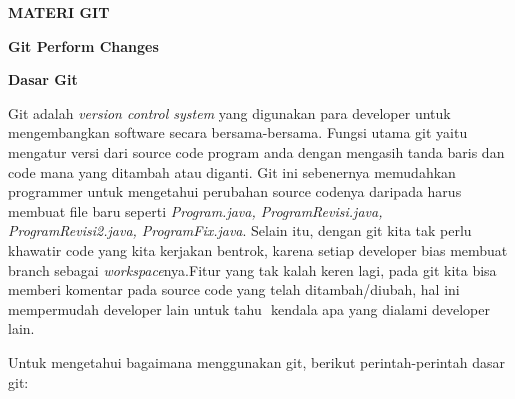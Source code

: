 
\sloppy
\begin{center}{\fontsize{16pt}{16pt}\selectfont \textbf{MATERI GIT} \\}\end{center} \par
\noindent 
\begin{center}{\fontsize{14pt}{14pt}\selectfont \textbf{Git Perform Changes} \\}\end{center} \par
\noindent 
{\fontsize{14pt}{14pt}\selectfont \textbf{Dasar Git} \\} \par
\noindent 
 \hspace*{0.5in} Git adalah $  $\textit{version control system} $  $yang digunakan para developer untuk mengembangkan software secara bersama-bersama. Fungsi utama git yaitu mengatur versi dari source code program anda dengan mengasih tanda baris dan code mana yang ditambah atau diganti. Git ini sebenernya memudahkan programmer untuk mengetahui perubahan source codenya daripada harus membuat file baru seperti $  $\textit{Program.java, ProgramRevisi.java, }\textit{ProgramRevisi2.java, ProgramFix.java}. Selain itu, dengan git kita tak perlu khawatir code yang kita kerjakan bentrok, karena setiap developer bias membuat branch sebagai $  $\textit{workspace}nya.Fitur yang tak kalah keren lagi, pada git kita bisa memberi komentar pada source code yang telah ditambah/diubah, hal ini mempermudah developer lain untuk tahu $  $ kendala apa yang dialami developer lain. \par
\noindent 
Untuk mengetahui bagaimana menggunakan git, berikut perintah-perintah dasar git: \par
\noindent 
